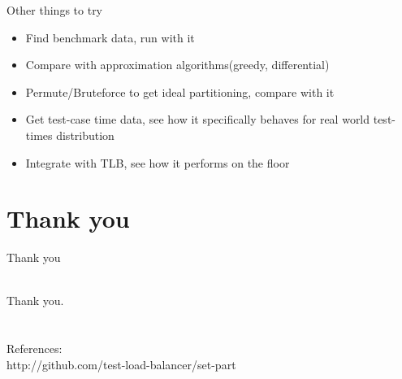 \documentclass{beamer}
\begin{document}
\begin{frame}{Other things to try}
  \begin{centering}
    \begin{itemize}
    \item Find benchmark data, run with it
      \pause
    \item Compare with approximation algorithms(greedy, differential)
      \pause
    \item Permute/Bruteforce to get ideal partitioning, compare with it
      \pause
    \item Get test-case time data, see how it specifically behaves for real world test-times distribution
      \pause
    \item Integrate with TLB, see how it performs on the floor
    \end{itemize}
  \end{centering}
\end{frame}

\section*{Thank you}

\begin{frame}{Thank you}
  \begin{centering}
    \quad\\
        {\huge Thank you.}\\
        \quad\\
        \quad\\
        References:\\
        http://github.com/test-load-balancer/set-part\\
  \end{centering}
\end{frame}



\end{document}
